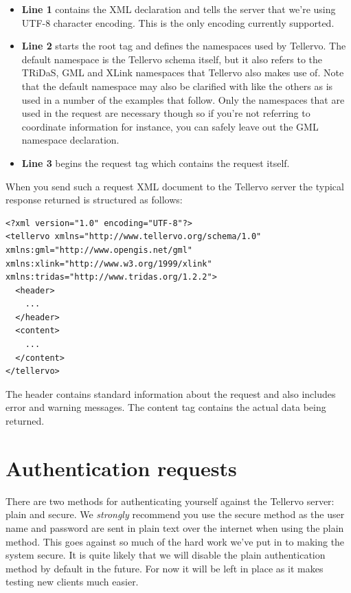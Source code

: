 \begin{itemize}
 \item \textbf{Line 1} contains the XML declaration and tells the server that we're using UTF-8 character encoding.  This is the only encoding currently supported.
 \item \textbf{Line 2} starts the root tag and defines the namespaces used by Tellervo.  The default namespace is the Tellervo schema itself, but it also refers to the TRiDaS, GML and XLink namespaces that Tellervo also makes use of.  Note that the default namespace may also be clarified with like the others as is used in a number of the examples that follow.  Only the namespaces that are used in the request are necessary though so if you're not referring to coordinate information for instance, you can safely leave out the GML namespace declaration.
 \item \textbf{Line 3} begins the request tag which contains the request itself. 
\end{itemize}






 

When you send such a request XML document to the Tellervo server the typical response returned is structured as follows:

\begin{lstlisting}
<?xml version="1.0" encoding="UTF-8"?>
<tellervo xmlns="http://www.tellervo.org/schema/1.0" xmlns:gml="http://www.opengis.net/gml" xmlns:xlink="http://www.w3.org/1999/xlink" xmlns:tridas="http://www.tridas.org/1.2.2">
  <header>
    ...
  </header>
  <content>
    ...
  </content>
</tellervo>
\end{lstlisting}

The header contains standard information about the request and also includes error and warning messages.  The content tag contains the actual data being returned.



\section{Authentication requests}

There are two methods for authenticating yourself against the Tellervo server: plain and secure.  We \emph{strongly} recommend you use the secure method as the user name and password are sent in plain text over the internet when using the plain method.  This goes against so much of the hard work we've put in to making the system secure.  It is quite likely that we will disable the plain authentication method by default in the future.  For now it will be left in place as it makes testing new clients much easier.  

